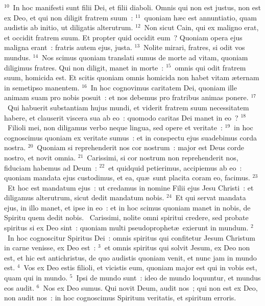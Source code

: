 ${}^{10}$~In hoc manifesti sunt filii Dei, et filii diaboli. Omnis qui non est justus, non est ex Deo, et qui non diligit fratrem suum~:
${}^{11}$~quoniam h\ae c est annuntiatio, quam audistis ab initio, ut diligatis alterutrum.
${}^{12}$~Non sicut Cain, qui ex maligno erat, et occidit fratrem suum. Et propter quid occidit eum~? Quoniam opera ejus maligna erant~: fratris autem ejus, justa.
${}^{13}$~Nolite mirari, fratres, si odit vos mundus.
${}^{14}$~Nos scimus quoniam translati sumus de morte ad vitam, quoniam diligimus fratres. Qui non diligit, manet in morte~:
${}^{15}$~omnis qui odit fratrem suum, homicida est. Et scitis quoniam omnis homicida non habet vitam \ae ternam in semetipso manentem.
${}^{16}$~In hoc cognovimus caritatem Dei, quoniam ille animam suam pro nobis posuit~: et nos debemus pro fratribus animas ponere.
${}^{17}$~Qui habuerit substantiam hujus mundi, et viderit fratrem suum necessitatem habere, et clauserit viscera sua ab eo~: quomodo caritas Dei manet in eo~?
${}^{18}$~Filioli mei, non diligamus verbo neque lingua, sed opere et veritate~:
${}^{19}$~in hoc cognoscimus quoniam ex veritate sumus~: et in conspectu ejus suadebimus corda nostra.
${}^{20}$~Quoniam si reprehenderit nos cor nostrum~: major est Deus corde nostro, et novit omnia.
${}^{21}$~Carissimi, si cor nostrum non reprehenderit nos, fiduciam habemus ad Deum~:
${}^{22}$~et quidquid petierimus, accipiemus ab eo~: quoniam mandata ejus custodimus, et ea, qu\ae\ sunt placita coram eo, facimus.
${}^{23}$~Et hoc est mandatum ejus~: ut credamus in nomine Filii ejus Jesu Christi~: et diligamus alterutrum, sicut dedit mandatum nobis.
${}^{24}$~Et qui servat mandata ejus, in illo manet, et ipse in eo~: et in hoc scimus quoniam manet in nobis, de Spiritu quem dedit nobis.
~Carissimi, nolite omni spiritui credere, sed probate spiritus si ex Deo sint~: quoniam multi pseudoprophet\ae\ exierunt in mundum.
${}^{2}$~In hoc cognoscitur Spiritus Dei~: omnis spiritus qui confitetur Jesum Christum in carne venisse, ex Deo est~:
${}^{3}$~et omnis spiritus qui solvit Jesum, ex Deo non est, et hic est antichristus, de quo audistis quoniam venit, et nunc jam in mundo est.
${}^{4}$~Vos ex Deo estis filioli, et vicistis eum, quoniam major est qui in vobis est, quam qui in mundo.
${}^{5}$~Ipsi de mundo sunt~: ideo de mundo loquuntur, et mundus eos audit.
${}^{6}$~Nos ex Deo sumus. Qui novit Deum, audit nos~; qui non est ex Deo, non audit nos~: in hoc cognoscimus Spiritum veritatis, et spiritum erroris.


